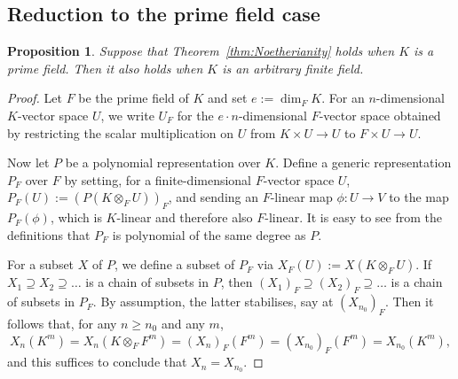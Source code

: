 \documentclass[10pt,a4paper]{amsart}
\theoremstyle{plain}
\newtheorem{prop}[thm]{Proposition}
\theoremstyle{definition}
\begin{document}
\subsection{Reduction to the prime field case}

\begin{prop} \label{prop:PrimeField}
Suppose that Theorem~\ref{thm:Noetherianity} holds when $K$
is a prime field. Then it also holds when $K$ is an
arbitrary finite field.
\end{prop}

\begin{proof}
Let $F$ be the prime field of $K$ and set $e:=\dim_F K$. For
an $n$-dimensional $K$-vector space $U$, we write $U_F$ for the
$e \cdot n$-dimensional $F$-vector space obtained by restricting the scalar
multiplication on $U$ from $K \times U \to U$ to $F \times U \to U$.

Now let $P$ be a polynomial representation over $K$. Define a generic
representation $P_F$ over $F$ by setting, for a finite-dimensional
$F$-vector space $U$, $P_F(U):=(P(K \otimes_F U))_F$, and sending an
$F$-linear map $\phi:U \to V$ to the map $P_F(\phi)$, which is $K$-linear
and therefore also $F$-linear. It is easy to see from the definitions
that $P_F$ is polynomial of the same degree as $P$.

For a subset $X$ of $P$, we define a subset of $P_F$ via
$X_F(U):=X(K \otimes_F U)$. If $X_1 \supseteq X_2 \supseteq \ldots$ is a
chain of subsets in $P$, then $(X_1)_F \supseteq (X_2)_F \supseteq \ldots$
is a chain of subsets in $P_F$. By assumption, the latter
stabilises, say at $(X_{n_0})_F$. Then it follows that, for any
$n \geq n_0$ and any $m$, 
\[ X_{n}(K^m)=X_{n}(K \otimes_F F^m)=(X_{n})_F(F^m)
=(X_{n_0})_F(F^m)=X_{n_0}(K^m), \]
and this suffices to conclude that $X_n=X_{n_0}$. 
\end{proof}

\begin{center}
\end{center}
\end{document}
